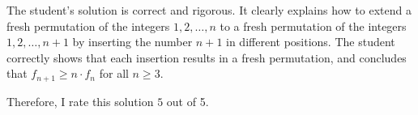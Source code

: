 The student's solution is correct and rigorous. It clearly explains how to extend a fresh permutation of the integers $1, 2, \dots, n$ to a fresh permutation of the integers $1, 2, \dots, n+1$ by inserting the number $n+1$ in different positions. The student correctly shows that each insertion results in a fresh permutation, and concludes that $f_{n+1} \geq n \cdot f_n$ for all $n \geq 3$. 

Therefore, I rate this solution $\boxed{5}$ out of 5.
